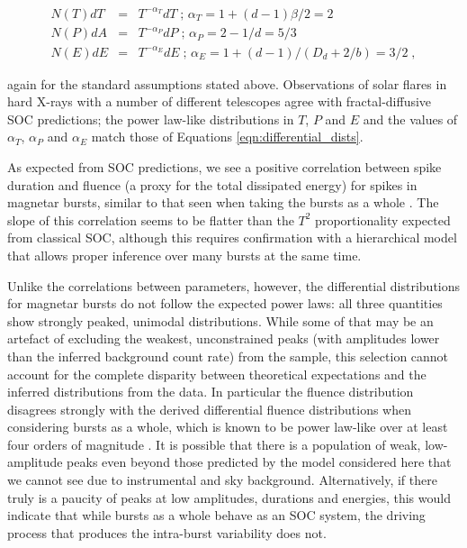 \documentclass[12pt]{emulateapj}
\begin{document}
\begin{eqnarray}
\label{eqn:differential_dists}
N(T) dT &=& T^{-\alpha_T}dT \;  \mbox{; $\alpha_T = 1 + (d-1)\beta/2$} = 2\nonumber \\ 
N(P) dA &=& T^{-\alpha_P}dP \; \mbox{; $\alpha_P = 2 - 1/d$} = 5/3 \\
N(E) dE & = &T^{-\alpha_E}dE  \;\mbox{; $\alpha_E = 1 + (d-1)/(D_d + 2/b)$} =  3/2 \; ,  \nonumber
\end{eqnarray}

again for the standard assumptions stated above. Observations of solar flares in hard X-rays with a number of different telescopes
agree with fractal-diffusive SOC predictions; the power law-like distributions in $T$, $P$ and $E$ and the values of $\alpha_T$, $\alpha_P$
and $\alpha_E$ match those of Equations \ref{eqn:differential_dists}.

As expected from SOC predictions, we see a positive correlation between spike duration and 
fluence (a proxy for the total dissipated energy) for spikes in magnetar bursts, similar to that seen when taking the bursts as a whole \citep{gogus1999}. 
The slope of this correlation seems to be flatter than the $T^{2}$ proportionality
expected from classical SOC, although this requires confirmation with a hierarchical model that allows proper inference over many
bursts at the same time.  

 Unlike the correlations between parameters, however, the differential
 distributions for magnetar bursts do not follow the expected power laws: all three quantities show strongly peaked, unimodal distributions.
 While some of that may be an artefact of excluding the weakest, unconstrained peaks (with amplitudes lower than the inferred
 background count rate) from the sample, this selection cannot account for the complete disparity between theoretical 
 expectations and the inferred distributions from the data. In particular the fluence distribution disagrees strongly
 with the derived differential fluence distributions when considering bursts as a whole, which is known to be power law-like over at least 
 four orders of magnitude \citep{gogus1999,gogus2000,prieskorn2012}.
 It is possible that there is a population of weak, low-amplitude peaks even beyond those predicted by the model considered 
 here that we cannot see due to instrumental and sky background.
Alternatively, if there truly is a paucity of peaks at low amplitudes, durations and energies, this would indicate that while bursts as a
whole behave as an SOC system, the driving process that produces the intra-burst variability does not.
\end{document}
